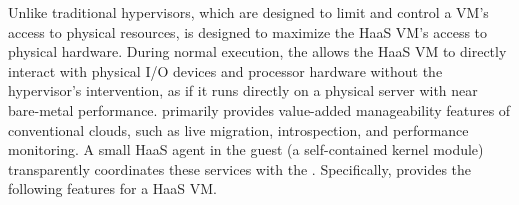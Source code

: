Unlike traditional hypervisors, which are designed to limit and control a VM's 
access to physical resources, \na is designed to maximize the HaaS VM's 
access to physical hardware.
During normal execution, the \na allows 
the HaaS VM to directly interact with physical I/O devices and processor hardware
without the hypervisor's intervention, 
as if it runs directly on a physical server with near bare-metal performance.
\na primarily provides value-added manageability 
features of conventional clouds, such as live
migration, introspection, and performance monitoring.
A small HaaS agent in the guest (a self-contained kernel module)
transparently coordinates these services with the \sna.
Specifically, \na provides the following features for a HaaS VM. 

%
%
%
%
%
